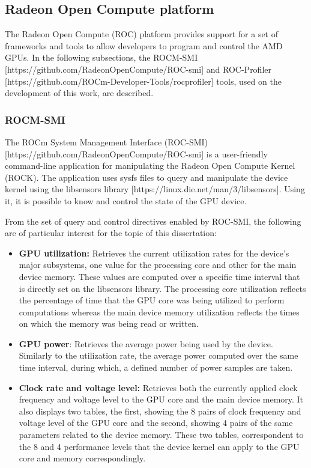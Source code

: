 \subsection{Radeon Open Compute platform}

The Radeon Open Compute (ROC) platform provides support for a set of frameworks and tools to allow developers to program and control the AMD GPUs.  In the following subsections, the ROCM-SMI [https://github.com/RadeonOpenCompute/ROC-smi] and ROC-Profiler [https://github.com/ROCm-Developer-Tools/rocprofiler] tools, used on the development of this work, are described.

\subsubsection{ROCM-SMI}
The ROCm System Management Interface (ROC-SMI) [https://github.com/RadeonOpenCompute/ROC-smi] is a user-friendly command-line application for manipulating the Radeon Open Compute Kernel (ROCK). The application uses sysfs files to query and manipulate the device kernel using the libsensors library [https://linux.die.net/man/3/libsensors]. Using it, it is possible to know and control the state of the GPU device.

From the set of query and control directives enabled by ROC-SMI, the following are of particular interest for the topic of this dissertation:

\begin{itemize}
\item \textbf{GPU utilization:} Retrieves the current utilization rates for the device's major subsystems, one value for the processing core and other for the main device memory. These values are computed over a specific time interval that is directly set on the libsensors library. The processing core utilization reflects the percentage of time that the GPU core was being utilized to perform computations whereas the main device memory utilization reflects the times on which the memory was being read or written.

\item \textbf{GPU power}: Retrieves the average power being used by the device. Similarly to the utilization rate, the average power computed over the same time interval, during which, a defined number of power samples are taken.

\item \textbf{Clock rate and voltage level:} Retrieves both the currently applied clock frequency and voltage level to the GPU core and the main device memory. It also displays two tables, the first, showing the 8 pairs of clock frequency and voltage level of the GPU core and the second, showing 4 pairs of the same parameters related to the device memory. These two tables, correspondent to the 8 and 4 performance levels that the device kernel can apply to the GPU core and memory correspondingly.
\end{itemize}

